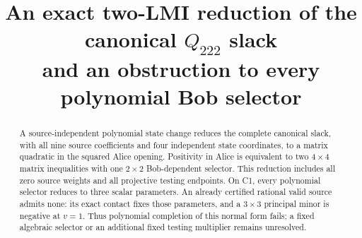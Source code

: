 \documentclass[11pt]{article}
\title{An exact two-LMI reduction of the canonical $Q_{222}$ slack\\
and an obstruction to every polynomial Bob selector}
\author{}
\date{}
\begin{document}
\maketitle
\vspace{-2em}
\begin{abstract}
A source-independent polynomial state change reduces the complete canonical
slack, with all nine source coefficients and four independent state coordinates,
to a matrix quadratic in the squared Alice opening.  Positivity in Alice is
equivalent to two $4\times4$ matrix inequalities with one $2\times2$ Bob-dependent
selector.  This reduction includes all zero source weights and all projective
testing endpoints.  On C1, every polynomial selector reduces to three scalar
parameters.  An already certified rational valid source admits none: its exact
contact fixes those parameters, and a $3\times3$ principal minor is negative at
$v=1$.  Thus polynomial completion of this normal form fails; a fixed algebraic
selector or an additional fixed testing multiplier remains unresolved.
\end{abstract}
\end{document}
